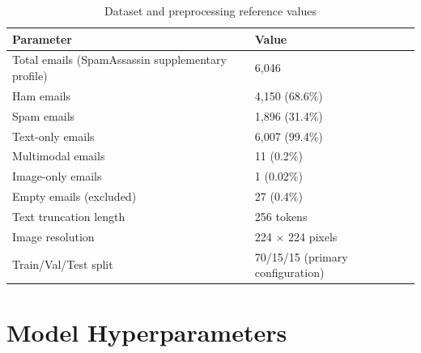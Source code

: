 \documentclass[10pt,twoside]{article}
\begin{document}
\begin{table}[h]
\centering
\caption{Dataset and preprocessing reference values}
\label{tab:appdataset}
\small
\begin{tabular}{ll}\toprule
Parameter & Value \\
\midrule
Total emails (SpamAssassin supplementary profile) & 6,046 \\
Ham emails & 4,150 (68.6\%) \\
Spam emails & 1,896 (31.4\%) \\
Text-only emails & 6,007 (99.4\%) \\
Multimodal emails & 11 (0.2\%) \\
Image-only emails & 1 (0.02\%) \\
Empty emails (excluded) & 27 (0.4\%) \\
Text truncation length & 256 tokens \\
Image resolution & 224 $\times$ 224 pixels \\
Train/Val/Test split & 70/15/15 (primary configuration) \\
\bottomrule
\end{tabular}

\end{table}

\section{Model Hyperparameters}\label{app:B}
\end{document}
